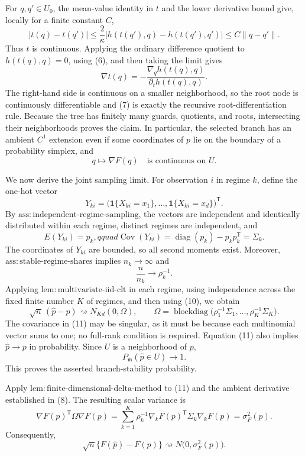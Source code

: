 For \(q,q'\in U_0\), the mean-value identity in \(t\) and the lower derivative bound give, locally for a finite constant \(C\),
\[
 |t(q)-t(q')|
 \leq \frac{2}{\kappa}
       |h(t(q'),q)-h(t(q'),q')|
 \leq C\|q-q'\|. \tag{6}
\]
Thus \(t\) is continuous. Applying the ordinary difference quotient to \(h(t(q),q)=0\), using (6), and then taking the limit gives
\[
 \nabla t(q)
 =-\frac{\nabla_q h(t(q),q)}{\partial_t h(t(q),q)}. \tag{7}
\]
The right-hand side is continuous on a smaller neighborhood, so the root node is continuously differentiable and (7) is exactly the recursive root-differentiation rule. Because the tree has finitely many guards, quotients, and roots, intersecting their neighborhoods proves the claim. In particular, the selected branch has an ambient \(C^1\) extension even if some coordinates of \(p\) lie on the boundary of a probability simplex, and
\[
 q\longmapsto \nabla F(q)
 \quad\text{is continuous on }U. \tag{8}
\]

We now derive the joint sampling limit. For observation \(i\) in regime \(k\), define the one-hot vector
\[
 Y_{ki}=\bigl(\mathbf 1\{X_{ki}=x_1\},\ldots,
                    \mathbf 1\{X_{ki}=x_d\}\bigr)^{\mathsf T}.
\]
By \(\mathrm{ass:independent\text{-}regime\text{-}sampling}\), the vectors are independent and identically distributed within each regime, distinct regimes are independent, and
\[
 E(Y_{ki})=p_k,qquad
 \operatorname{Cov}(Y_{ki})
 =\operatorname{diag}(p_k)-p_kp_k^{\mathsf T}
 =\Sigma_k. \tag{9}
\]
The coordinates of \(Y_{ki}\) are bounded, so all second moments exist. Moreover, \(\mathrm{ass:stable\text{-}regime\text{-}shares}\) implies \(n_k\to\infty\) and
\[
 \frac{n}{n_k}\longrightarrow\rho_k^{-1}. \tag{10}
\]
Applying \(\mathrm{lem:multivariate\text{-}iid\text{-}clt}\) in each regime, using independence across the fixed finite number \(K\) of regimes, and then using (10), we obtain
\[
 \sqrt n\,(\widehat p-p)
 \rightsquigarrow
 N_{Kd}(0,\Omega),
 \qquad
 \Omega=\operatorname{blockdiag}
 \bigl(\rho_1^{-1}\Sigma_1,\ldots,
       \rho_K^{-1}\Sigma_K\bigr). \tag{11}
\]
The covariance in (11) may be singular, as it must be because each multinomial vector sums to one; no full-rank condition is required. Equation (11) also implies \(\widehat p\to p\) in probability. Since \(U\) is a neighborhood of \(p\),
\[
 P_{\mathfrak m}(\widehat p\in U)\longrightarrow1. \tag{12}
\]
This proves the asserted branch-stability probability.

Apply \(\mathrm{lem:finite\text{-}dimensional\text{-}delta\text{-}method}\) to (11) and the ambient derivative established in (8). The resulting scalar variance is
\[
 \nabla F(p)^{\mathsf T}\Omega\nabla F(p)
 =\sum_{k=1}^{K}\rho_k^{-1}
   \nabla_kF(p)^{\mathsf T}\Sigma_k\nabla_kF(p)
 =\sigma_F^2(p). \tag{13}
\]
Consequently,
\[
 \sqrt n\{F(\widehat p)-F(p)\}
 \rightsquigarrow N\bigl(0,\sigma_F^2(p)\bigr). \tag{14}
\]

